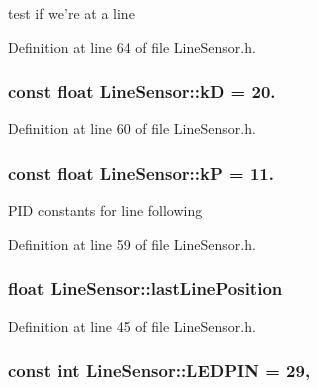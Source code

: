 test if we're at a line 



Definition at line 64 of file Line\-Sensor.\-h.

\hypertarget{classLineSensor_a62c587ff3d58f72a74ae39429b7d0837}{
\subsubsection[{k\-D}]{\setlength{\rightskip}{0pt plus 5cm}const float Line\-Sensor\-::k\-D = 20.\hspace{0.3cm}{\ttfamily [private]}}}\label{classLineSensor_a62c587ff3d58f72a74ae39429b7d0837}


Definition at line 60 of file Line\-Sensor.\-h.

\hypertarget{classLineSensor_af246497cb5a3386afcc4ce864949c57f}{
\subsubsection[{k\-P}]{\setlength{\rightskip}{0pt plus 5cm}const float Line\-Sensor\-::k\-P = 11.\hspace{0.3cm}{\ttfamily [private]}}}\label{classLineSensor_af246497cb5a3386afcc4ce864949c57f}
P\-I\-D constants for line following 

Definition at line 59 of file Line\-Sensor.\-h.

\hypertarget{classLineSensor_a347e843234a242ded12e83badf4718ed}{
\subsubsection[{last\-Line\-Position}]{\setlength{\rightskip}{0pt plus 5cm}float Line\-Sensor\-::last\-Line\-Position\hspace{0.3cm}{\ttfamily [private]}}}\label{classLineSensor_a347e843234a242ded12e83badf4718ed}


Definition at line 45 of file Line\-Sensor.\-h.

\hypertarget{classLineSensor_a09da44442cb9e026af2053b5d0b4f2ce}{
\subsubsection[{L\-E\-D\-P\-I\-N}]{\setlength{\rightskip}{0pt plus 5cm}const int Line\-Sensor\-::\-L\-E\-D\-P\-I\-N = 29\hspace{0.3cm}{\ttfamily [static]}, {\ttfamily [private]}}}\label{classLineSensor_a09da44442cb9e026af2053b5d0b4f2ce}


